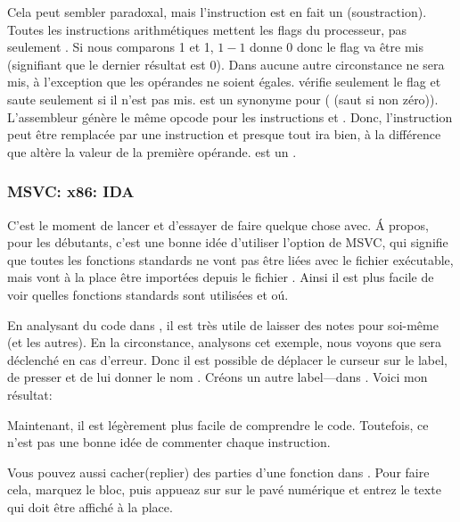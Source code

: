 \label{CMPandSUB} 
Cela peut sembler paradoxal, mais l'instruction \CMP est en fait un \SUB (soustraction).
Toutes les instructions arithmétiques mettent les flags du processeur, pas seulement \CMP.
Si nous comparons 1 et 1, $1-1$ donne 0 donc le flag \ZF va être mis (signifiant
que le dernier résultat est 0).
Dans aucune autre circonstance \ZF ne sera mis, à l'exception que les opérandes
ne soient égales.
\JNE vérifie seulement le flag \ZF et saute seulement si il n'est pas mis. \JNE
est un synonyme pour \JNZ ( (saut si non zéro)).
L'assembleur génère le même opcode pour les instructions \JNE et \JNZ.
Donc, l'instruction \CMP peut être remplacée par une instruction \SUB et presque
tout ira bien, à la différence que \SUB altère la valeur de la première opérande.
\CMP est un .

\subsubsection{MSVC: x86: IDA}

C'est le moment de lancer \IDA et d'essayer de faire quelque chose avec.
Á propos, pour les débutants, c'est une bonne idée d'utiliser l'option 
de MSVC, qui signifie que toutes les fonctions standards ne vont pas être liées
avec le fichier exécutable, mais vont à la place être importées depuis le fichier
.
Ainsi il est plus facile de voir quelles fonctions standards sont utilisées et oú.

En analysant du code dans \IDA, il est très utile de laisser des notes pour soi-même
(et les autres).
En la circonstance, analysons cet exemple, nous voyons que  sera déclenché
en cas d'erreur.
Donc il est possible de déplacer le curseur sur le label, de presser  et de
lui donner le nom .
Créons un autre label---dans .
Voici mon résultat:



Maintenant, il est légèrement plus facile de comprendre le code.
Toutefois, ce n'est pas une bonne idée de commenter chaque instruction.

Vous pouvez aussi cacher(replier) des parties d'une fonction dans \IDA.
Pour faire cela, marquez le bloc, puis appueaz sur \q{--} sur le pavé numérique et
entrez le texte qui doit être affiché à la place.

